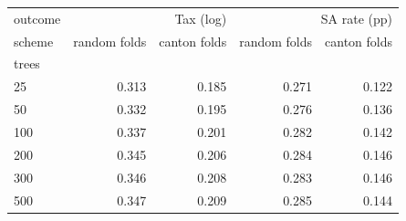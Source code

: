 \begin{tabular}{lrrrr}
\toprule
outcome & \multicolumn{2}{r}{Tax (log)} & \multicolumn{2}{r}{SA rate (pp)} \\
scheme & random folds & canton folds & random folds & canton folds \\
trees &  &  &  &  \\
\midrule
25 & 0.313 & 0.185 & 0.271 & 0.122 \\
50 & 0.332 & 0.195 & 0.276 & 0.136 \\
100 & 0.337 & 0.201 & 0.282 & 0.142 \\
200 & 0.345 & 0.206 & 0.284 & 0.146 \\
300 & 0.346 & 0.208 & 0.283 & 0.146 \\
500 & 0.347 & 0.209 & 0.285 & 0.144 \\
\bottomrule
\end{tabular}
